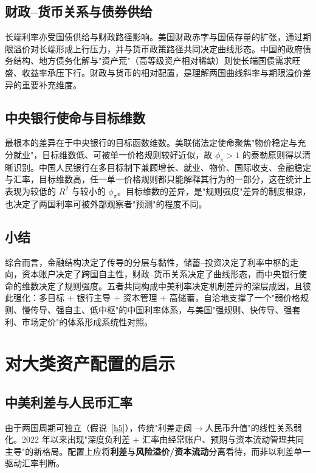 \documentclass[12pt,a4paper]{ctexart}
\begin{document}
\subsection{财政--货币关系与债券供给}
长端利率亦受国债供给与财政路径影响。美国财政赤字与国债存量的扩张，通过期限溢价对长端形成上行压力，并与货币政策路径共同决定曲线形态。中国的政府债务结构、地方债务化解与"资产荒"（高等级资产相对稀缺）则使长端国债需求旺盛、收益率承压下行。财政与货币的相对配置，是理解两国曲线斜率与期限溢价差异的重要补充维度。

\subsection{中央银行使命与目标维数}
最根本的差异在于中央银行的目标函数维数。美联储法定使命聚焦"物价稳定与充分就业"，目标维数低、可被单一价格规则较好近似，故 $\phi_\pi>1$ 的泰勒原则得以清晰识别。中国人民银行在多目标制下兼顾增长、就业、物价、国际收支、金融稳定与汇率，目标维数高，任一单一价格规则都只能解释其行为的一部分，这在统计上表现为较低的 $R^2$ 与较小的 $\phi_\pi$。目标维数的差异，是"规则强度"差异的制度根源，也决定了两国利率可被外部观察者"预测"的程度不同。

\subsection{小结}
综合而言，金融结构决定了传导的分层与黏性，储蓄--投资决定了利率中枢的走向，资本账户决定了跨国自主性，财政--货币关系决定了曲线形态，而中央银行使命的维数决定了规则强度。五者共同构成中美利率决定机制差异的深层成因，且彼此强化：多目标 $+$ 银行主导 $+$ 资本管理 $+$ 高储蓄，自洽地支撑了一个"弱价格规则、慢传导、强自主、低中枢"的中国利率体系，与美国"强规则、快传导、强套利、市场定价"的体系形成系统性对照。

\section{对大类资产配置的启示}

\subsection{中美利差与人民币汇率}
由于两国周期可独立（假说~\ref{h5}），传统"利差走阔$\to$人民币升值"的线性关系弱化。2022 年以来出现"深度负利差 $+$ 汇率由经常账户、预期与资本流动管理共同主导"的新格局。配置上应将\textbf{利差}与\textbf{风险溢价/资本流动}分离看待，而非以利差单一驱动汇率判断。
\end{document}
